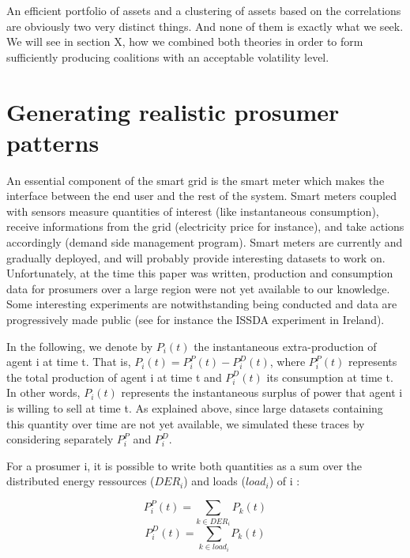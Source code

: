 \documentclass[conference]{IEEEtran}
\begin{document}
An efficient portfolio of assets and a clustering of assets based on the correlations are obviously two very distinct things. And none of them is exactly what we seek. We will see in section X, how we combined both theories in order to form sufficiently producing coalitions with an acceptable volatility level.

%
%

\section{Generating realistic prosumer patterns}
\label{sec:data}

An essential component of the smart grid is the smart meter which makes the interface between the end user and the rest of the system. Smart meters coupled with sensors measure quantities of interest (like instantaneous consumption), receive informations from the grid (electricity price for instance), and take actions accordingly (demand side management program). Smart meters are currently and gradually deployed, and will probably provide interesting datasets to work on. Unfortunately, at the time this paper was written, production and consumption data for prosumers over a large region were not yet available to our knowledge. Some interesting experiments are notwithstanding being conducted and data are progressively made public (see for instance the ISSDA experiment in Ireland). 

In the following, we denote by $ P_{i}(t) $ the instantaneous extra-production of agent i at time t. That is, $ P_{i}(t) = P_{i}^{P}(t) - P_{i}^{D}(t) $, where $ P_{i}^{P}(t) $ represents the total production of agent i at time t and $ P_{i}^{D}(t) $ its consumption at time t. In other words, $ P_{i}(t) $ represents the instantaneous surplus of power that agent i is willing to sell at time t. As explained above, since large datasets containing this quantity over time are not yet available, we simulated these traces by considering separately $ P_{i}^{P} $ and $ P_{i}^{D} $.

For a prosumer i, it is possible to write both quantities as a sum over the distributed energy ressources ($ DER_{i} $) and loads ($ load_{i} $) of i : 

\begin{equation}
P_{i}^{P}(t) = \sum_{k \in DER_{i}} P_{k}(t)
\end{equation}
\begin{equation}
P_{i}^{D}(t) = \sum_{k \in load_{i}} P_{k}(t)
\end{equation}
\end{document}
